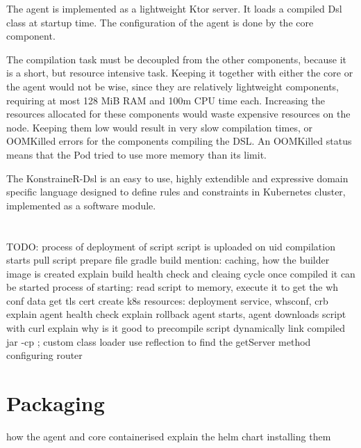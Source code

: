 The agent is implemented as a lightweight Ktor server. It loads a compiled Dsl class at startup time. The configuration of the agent is done by the core component.

The compilation task must be decoupled from the other components, because it is a short, but resource intensive task. Keeping it together with either the core or the agent would not be wise, since they are relatively lightweight components, requiring at most 128 MiB RAM and 100m CPU time each. Increasing the resources allocated for these components would waste expensive resources on the node. Keeping them low would result in very slow compilation times, or OOMKilled errors for the components compiling the DSL. An OOMKilled status means that the Pod tried to use more memory than its limit.


The KonstraineR-Dsl is an easy to use, highly extendible and expressive domain specific language designed to define rules and constraints in Kubernetes cluster, implemented as a software module.

\section{}

TODO:
    process of deployment of script
        script is uploaded on uid
        compilation starts
            pull script
            prepare file
            gradle build
            mention: caching, how the builder image is created
            explain build health check and cleaing cycle
        once compiled it can be started
        process of starting:    
            read script to memory, execute it to get the wh conf data
            get tls cert
            create k8s resources: deployment service, whsconf, crb
            explain agent health check
            explain rollback
        agent starts, agent downloads script with curl
            explain why is it good to precompile script
            dynamically link compiled jar -cp ; custom class loader
            use reflection to find the getServer method
            configuring router
            
                
\section{Packaging}
how the agent and core containerised
explain the helm chart installing them


